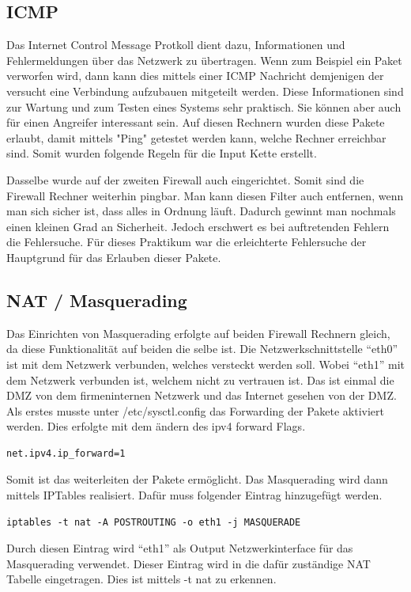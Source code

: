 \subsection{ICMP}
Das Internet Control Message Protkoll dient dazu, Informationen und Fehlermeldungen über das Netzwerk zu übertragen. Wenn zum Beispiel ein Paket verworfen wird, dann kann dies mittels einer ICMP Nachricht demjenigen der versucht eine Verbindung aufzubauen mitgeteilt werden. Diese Informationen sind zur Wartung und zum Testen eines Systems sehr praktisch. Sie können aber auch für einen Angreifer interessant sein. Auf diesen Rechnern wurden diese Pakete erlaubt, damit mittels "Ping" getestet werden kann, welche Rechner erreichbar sind. Somit wurden folgende Regeln für die Input Kette erstellt.

Dasselbe wurde auf der zweiten Firewall auch eingerichtet. Somit sind die Firewall Rechner weiterhin pingbar. Man kann diesen Filter auch entfernen, wenn man sich sicher ist, dass alles in Ordnung läuft. Dadurch gewinnt man nochmals einen kleinen Grad an Sicherheit. Jedoch erschwert es bei auftretenden Fehlern die Fehlersuche. Für dieses Praktikum war die erleichterte Fehlersuche der Hauptgrund für das Erlauben dieser Pakete.

\subsection{NAT / Masquerading}
Das Einrichten von Masquerading erfolgte auf beiden Firewall Rechnern gleich, da diese Funktionalität auf beiden die selbe ist. Die Netzwerkschnittstelle "`eth0"' ist mit dem Netzwerk verbunden, welches versteckt werden soll. Wobei "`eth1"' mit dem Netzwerk verbunden ist, welchem nicht zu vertrauen ist. Das ist einmal die DMZ von dem firmeninternen Netzwerk und das Internet gesehen von der DMZ. \\
Als erstes musste unter /etc/sysctl.config das Forwarding der Pakete aktiviert werden. Dies erfolgte mit dem ändern des ipv4 forward Flags.
\begin{lstlisting}[caption={/etc/sysctl.config}]
net.ipv4.ip_forward=1
\end{lstlisting}
Somit ist das weiterleiten der Pakete ermöglicht. Das Masquerading wird dann mittels IPTables realisiert. Dafür muss folgender Eintrag hinzugefügt werden.
\begin{lstlisting}
iptables -t nat -A POSTROUTING -o eth1 -j MASQUERADE
\end{lstlisting}
Durch diesen Eintrag wird "`eth1"' als Output Netzwerkinterface für das Masquerading verwendet. Dieser Eintrag wird in die dafür zuständige NAT Tabelle eingetragen. Dies ist mittels -t nat zu erkennen.

